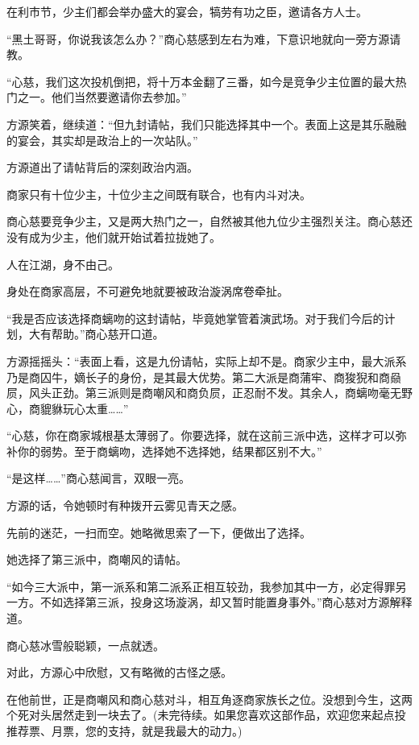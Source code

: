 \begin{this_body}
在利市节，少主们都会举办盛大的宴会，犒劳有功之臣，邀请各方人士。

“黑土哥哥，你说我该怎么办？”商心慈感到左右为难，下意识地就向一旁方源请教。

“心慈，我们这次投机倒把，将十万本金翻了三番，如今是竞争少主位置的最大热门之一。他们当然要邀请你去参加。”

方源笑着，继续道：“但九封请帖，我们只能选择其中一个。表面上这是其乐融融的宴会，其实却是政治上的一次站队。”

方源道出了请帖背后的深刻政治内涵。

商家只有十位少主，十位少主之间既有联合，也有内斗对决。

商心慈要竞争少主，又是两大热门之一，自然被其他九位少主强烈关注。商心慈还没有成为少主，他们就开始试着拉拢她了。

人在江湖，身不由己。

身处在商家高层，不可避免地就要被政治漩涡席卷牵扯。

“我是否应该选择商螭吻的这封请帖，毕竟她掌管着演武场。对于我们今后的计划，大有帮助。”商心慈开口道。

方源摇摇头：“表面上看，这是九份请帖，实际上却不是。商家少主中，最大派系乃是商囚牛，嫡长子的身份，是其最大优势。第二大派是商蒲牢、商狻猊和商赑屃，风头正劲。第三派则是商嘲风和商负屃，正忍耐不发。其余人，商螭吻毫无野心，商貔貅玩心太重……”

“心慈，你在商家城根基太薄弱了。你要选择，就在这前三派中选，这样才可以弥补你的弱势。至于商螭吻，选择她不选择她，结果都区别不大。”

“是这样……”商心慈闻言，双眼一亮。

方源的话，令她顿时有种拨开云雾见青天之感。

先前的迷茫，一扫而空。她略微思索了一下，便做出了选择。

她选择了第三派中，商嘲风的请帖。

“如今三大派中，第一派系和第二派系正相互较劲，我参加其中一方，必定得罪另一方。不如选择第三派，投身这场漩涡，却又暂时能置身事外。”商心慈对方源解释道。

商心慈冰雪般聪颖，一点就透。

对此，方源心中欣慰，又有略微的古怪之感。

在他前世，正是商嘲风和商心慈对斗，相互角逐商家族长之位。没想到今生，这两个死对头居然走到一块去了。(未完待续。如果您喜欢这部作品，欢迎您来起点投推荐票、月票，您的支持，就是我最大的动力。)

\end{this_body}

